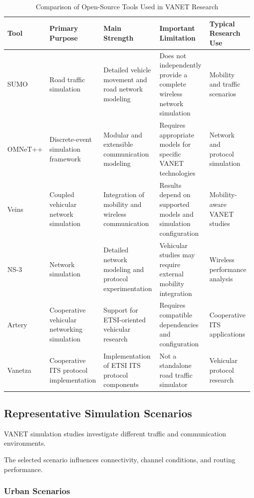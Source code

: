 \begin{table}[t]
\centering
\caption{Comparison of Open-Source Tools Used in VANET Research}
\label{tab:simulation_tools}
\footnotesize
\begin{tabular}{|p{2.0cm}|p{3.1cm}|p{3.6cm}|p{3.6cm}|p{2.9cm}|}
\hline
\textbf{Tool} &
\textbf{Primary Purpose} &
\textbf{Main Strength} &
\textbf{Important Limitation} &
\textbf{Typical Research Use} \\
\hline
SUMO &
Road traffic simulation &
Detailed vehicle movement and road network modeling &
Does not independently provide a complete wireless network simulation &
Mobility and traffic scenarios \\
\hline
OMNeT++ &
Discrete-event simulation framework &
Modular and extensible communication modeling &
Requires appropriate models for specific VANET technologies &
Network and protocol simulation \\
\hline
Veins &
Coupled vehicular network simulation &
Integration of mobility and wireless communication &
Results depend on supported models and simulation configuration &
Mobility-aware VANET studies \\
\hline
NS-3 &
Network simulation &
Detailed network modeling and protocol experimentation &
Vehicular studies may require external mobility integration &
Wireless performance analysis \\
\hline
Artery &
Cooperative vehicular networking simulation &
Support for ETSI-oriented vehicular research &
Requires compatible dependencies and configuration &
Cooperative ITS applications \\
\hline
Vanetza &
Cooperative ITS protocol implementation &
Implementation of ETSI ITS protocol components &
Not a standalone road traffic simulator &
Vehicular protocol research \\
\hline
\end{tabular}
\end{table}

\subsection{Representative Simulation Scenarios}
\label{sec:4C}

VANET simulation studies investigate
different traffic and communication
environments.

The selected scenario influences
connectivity, channel conditions,
and routing performance.

\subsubsection{Urban Scenarios}

